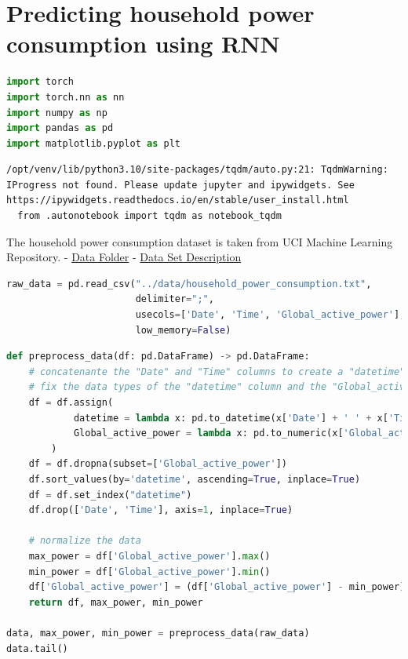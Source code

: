 \section{Predicting household power consumption using
RNN}\label{predicting-household-power-consumption-using-rnn}

\begin{lstlisting}[language=Python]
import torch
import torch.nn as nn
import numpy as np
import pandas as pd
import matplotlib.pyplot as plt
\end{lstlisting}

\begin{lstlisting}
/opt/venv/lib/python3.10/site-packages/tqdm/auto.py:21: TqdmWarning: IProgress not found. Please update jupyter and ipywidgets. See https://ipywidgets.readthedocs.io/en/stable/user_install.html
  from .autonotebook import tqdm as notebook_tqdm
\end{lstlisting}

The household power consumption dataset is taken from UCI Machine
Learning Repository. -
\href{https://archive.ics.uci.edu/ml/machine-learning-databases/00235/}{Data
Folder} -
\href{https://archive.ics.uci.edu/ml/datasets/individual+household+electric+power+consumption\#}{Data
Set Description}

\begin{lstlisting}[language=Python]
raw_data = pd.read_csv("../data/household_power_consumption.txt",
                       delimiter=";",
                       usecols=['Date', 'Time', 'Global_active_power'],
                       low_memory=False)
\end{lstlisting}

\begin{lstlisting}[language=Python]
def preprocess_data(df: pd.DataFrame) -> pd.DataFrame:
    # concatenante the "Date" and "Time" columns to create a "datetime" column
    # fix the data types of the "datetime" column and the "Global_active_power" column
    df = df.assign(
            datetime = lambda x: pd.to_datetime(x['Date'] + ' ' + x['Time']),
            Global_active_power = lambda x: pd.to_numeric(x['Global_active_power'], errors='coerce'),
        )
    df = df.dropna(subset=['Global_active_power'])
    df.sort_values(by='datetime', ascending=True, inplace=True)
    df = df.set_index("datetime")
    df.drop(['Date', 'Time'], axis=1, inplace=True)

    # normalize the data
    max_power = df['Global_active_power'].max()
    min_power = df['Global_active_power'].min()
    df['Global_active_power'] = (df['Global_active_power'] - min_power) / (max_power - min_power)
    return df, max_power, min_power

data, max_power, min_power = preprocess_data(raw_data)
data.tail()
\end{lstlisting}

